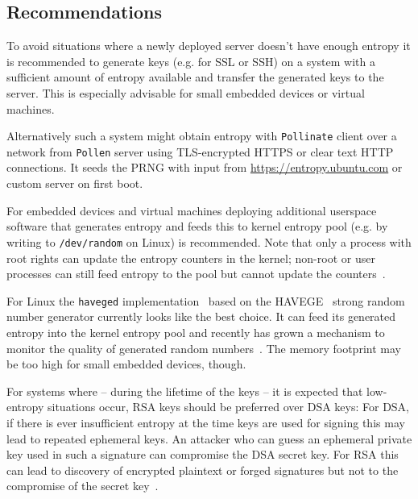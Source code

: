 \subsection{Recommendations}

To avoid situations where a newly deployed server doesn't have enough
entropy it is recommended to generate keys (e.g. for SSL or SSH) on
a system with a sufficient amount of entropy available and transfer the generated keys
to the server.  This is especially advisable for small embedded devices
or virtual machines.

Alternatively such a system might obtain entropy with \verb+Pollinate+
client over a network from \verb+Pollen+ server using TLS-encrypted
HTTPS or clear text HTTP connections. It seeds the PRNG with input
from \url{https://entropy.ubuntu.com} or custom server on first boot.

For embedded devices and virtual machines deploying additional userspace
software that generates entropy and feeds this to kernel entropy pool
(e.g. by writing to \verb+/dev/random+ on Linux) is recommended. Note
that only a process with root rights can update the entropy counters in the
kernel; non-root or user processes can still feed entropy to the pool but
cannot update the counters~\cite{Wikipedia:/dev/random}.

For Linux the \verb+haveged+
implementation~\cite{HAV13a} based on the HAVEGE~\cite{SS03}
strong random number generator currently looks like the best choice. It
can feed its generated entropy into the kernel entropy pool and recently
has grown a mechanism to monitor the quality of generated random
numbers~\cite{HAV13b}. The memory footprint may be too high for small
embedded devices, though.

For systems where -- during the lifetime of the keys -- it is expected
that low-entropy situations occur, RSA keys should be preferred over DSA
keys: For DSA, if there is ever insufficient entropy at the time keys
are used for signing this may lead to repeated ephemeral keys. An
attacker who can guess an ephemeral private key used in such a signature
can compromise the DSA secret key.
For RSA this can lead to discovery of encrypted plaintext or forged
signatures but not to the compromise of the secret key~\cite{HDWH12}.

